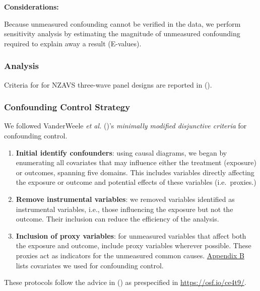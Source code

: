 \documentclass[
  singlecolumn]{article}
\begin{document}
\textbf{Considerations:}

Because unmeasured confounding cannot be verified in the data, we
perform sensitivity analysis by estimating the magnitude of unmeasured
confounding required to explain away a result (E-values).

\subsubsection{Analysis}\label{analysis}

Criteria for for NZAVS three-wave panel designs are reported in
().

\subsubsection{Confounding Control
Strategy}\label{confounding-control-strategy}

We followed VanderWeele \emph{et al.}
()'s \emph{minimally modified
disjunctive criteria} for confounding control.

\begin{enumerate}
\def\labelenumi{\arabic{enumi}.}
\item
  \textbf{Initial identify confounders}: using causal diagrams, we began
  by enumerating all covariates that may influence either the treatment
  (exposure) or outcomes, spanning five domains. This includes variables
  directly affecting the exposure or outcome and potential effects of
  these variables (i.e.~proxies.)
\item
  \textbf{Remove instrumental variables}: we removed variables
  identified as instrumental variables, i.e., those influencing the
  exposure but not the outcome. Their inclusion can reduce the
  efficiency of the analysis.
\item
  \textbf{Inclusion of proxy variables}: for unmeasured variables that
  affect both the exposure and outcome, include proxy variables wherever
  possible. These proxies act as indicators for the unmeasured common
  causes. \hyperref[appendix-demographics]{Appendix B} lists covariates
  we used for confounding control.
\end{enumerate}

These protocols follow the advice in
() as prespecified in
\url{https://osf.io/ce4t9/}.
\end{document}
